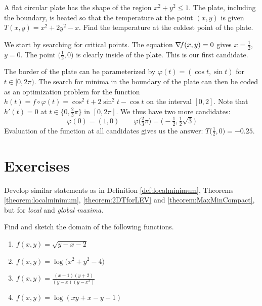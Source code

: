 \begin{example}
A flat circular plate has the shape of the region $x^2+y^2 \leq 1$. The plate, including the boundary, is heated so that the temperature at the point $(x,y)$ is given $T(x,y) =x^2 +2 y^2 - x$.  Find the temperature at the coldest point of the plate.

We start by searching for critical points.  The equation $\mathop{\nabla\! {f}}(x,y) = 0$ gives $x=\tfrac{1}{2}$, $y=0$. The point $\big(\tfrac{1}{2}, 0\big)$ is clearly inside of the plate.  This is our first candidate.

The border of the plate can be parameterized by $\varphi(t) = (\cos t, \sin t)$ for $t \in [0,2\pi)$.  The search for minima in the boundary of the plate can then be coded as an optimization problem for the function $h(t) = f \circ \varphi (t) = \cos^2 t + 2\sin^2 t - \cos t$ on the interval $[0,2]$.  Note that $h'(t) = 0$ at $t \in \{ 0, \tfrac{2}{3}\pi \}$ in $[0,2\pi]$.  We thus have two more candidates: 
\begin{equation*}
\varphi(0) = (1,0) \qquad \varphi\big(\tfrac{2}{3}\pi\big)= \big( -\tfrac{1}{2}, \tfrac{1}{2}\sqrt{3} \big)
\end{equation*}
Evaluation of the function at all candidates gives us the answer: $T\big( \tfrac{1}{2}, 0 \big) = -0.25$.
\end{example}

\section{Exercises}
\begin{problem}\label{problem:maxima}
Develop similar statements as in Definition \ref{def:localminimum}, Theorems \ref{theorem:localminimum}, \ref{theorem:2DTforLEV} and \ref{theorem:MaxMinCompact}, but for \emph{local} and \emph{global maxima}.
\end{problem}

\begin{problem}[Domains]
Find and sketch the domain of the following functions.
\begin{enumerate}
	\item $f(x,y) = \sqrt{y-x-2}$
	\item $f(x,y) = \log \big( x^2+y^2-4 \big)$
	\item $f(x,y) = \frac{(x-1)(y+2)}{(y-x)(y-x^3)}$
	\item $f(x,y) = \log (xy+x-y-1)$
\end{enumerate}
\end{problem}

